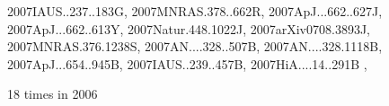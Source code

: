 \documentclass[12pt]{article}
\begin{document}
\begin{description}
{2007IAUS..237..183G,%
2007MNRAS.378..662R,%
2007ApJ...662..627J,%
2007ApJ...662..613Y,%
2007Natur.448.1022J,%
2007arXiv0708.3893J,%
2007MNRAS.376.1238S,%
2007AN....328..507B,%
2007AN....328.1118B,%
2007ApJ...654..945B,%
2007IAUS..239..457B,%
2007HiA....14..291B%
},\item
18 times in 2006 \citep{
2006ApJ...653..558O,%
2006A&A...459..935H,%
2006A&A...457..371F,%
2006MNRAS.370..529D,%
2006PhFl...18g5106H,%
2006ApJ...643.1219J,%
2006ApJ...636.1121J,%
2006MNRAS.370L..71J,%
2006A&A...448L..33S,%
2006MNRAS.370..415M,%
}
\end{description}
\end{document}
